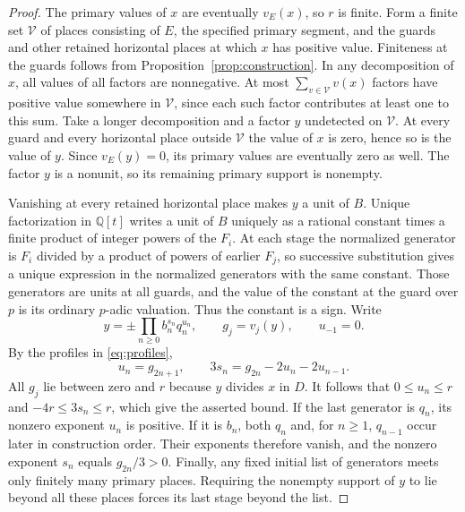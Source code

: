 \begin{proof}
    The primary values of $x$ are eventually $v_E(x)$, so $r$ is finite.
    Form a finite set $\mathcal{V}$ of places consisting of $E$, the specified primary segment, and the guards and other retained horizontal places at which $x$ has positive value.
    Finiteness at the guards follows from Proposition~\ref{prop:construction}.
    In any decomposition of $x$, all values of all factors are nonnegative.
    At most $\sum_{v \in \mathcal{V}} v(x)$ factors have positive value somewhere in $\mathcal{V}$, since each such factor contributes at least one to this sum.
    Take a longer decomposition and a factor $y$ undetected on $\mathcal{V}$.
    At every guard and every horizontal place outside $\mathcal{V}$ the value of $x$ is zero, hence so is the value of $y$.
    Since $v_E(y) = 0$, its primary values are eventually zero as well.
    The factor $y$ is a nonunit, so its remaining primary support is nonempty.

    Vanishing at every retained horizontal place makes $y$ a unit of $B$.
    Unique factorization in $\mathbb{Q}[t]$ writes a unit of $B$ uniquely as a rational constant times a finite product of integer powers of the $F_i$.
    At each stage the normalized generator is $F_i$ divided by a product of powers of earlier $F_j$, so successive substitution gives a unique expression in the normalized generators with the same constant.
    Those generators are units at all guards, and the value of the constant at the guard over $p$ is its ordinary $p$-adic valuation.
    Thus the constant is a sign.
    Write
    \[
        y = \pm \prod_{n \ge 0} b_n^{s_n} q_n^{u_n},
        \qquad g_j = v_j(y), \qquad u_{-1} = 0.
    \]
    By the profiles in \eqref{eq:profiles},
    \[
        u_n = g_{2n + 1},
        \qquad
        3s_n = g_{2n} - 2u_n - 2u_{n - 1}.
    \]
    All $g_j$ lie between zero and $r$ because $y$ divides $x$ in $D$.
    It follows that $0 \le u_n \le r$ and $-4r \le 3s_n \le r$, which give the asserted bound.
    If the last generator is $q_n$, its nonzero exponent $u_n$ is positive.
    If it is $b_n$, both $q_n$ and, for $n \ge 1$, $q_{n - 1}$ occur later in construction order.
    Their exponents therefore vanish, and the nonzero exponent $s_n$ equals $g_{2n}/3 > 0$.
    Finally, any fixed initial list of generators meets only finitely many primary places.
    Requiring the nonempty support of $y$ to lie beyond all these places forces its last stage beyond the list.
\end{proof}


